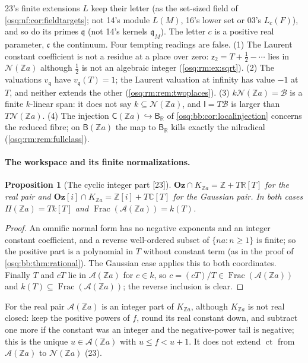 \documentclass[11pt,letterpaper]{article}
\numberwithin{equation}{section}
\newtheorem{proposition}[proposition]{Proposition}
\theoremstyle{definition}
\theoremstyle{remark}
\theoremstyle{plain}
\newcommand{\Oz}{\mathbf{Oz}}
\newcommand{\GOz}{\Oz[i]}
\newcommand{\Z}{\mathbb Z}
\newcommand{\R}{\mathbb R}
\newcommand{\C}{\mathbb C}
\newcommand{\A}{\mathcal A}          %
\newcommand{\NN}{\mathcal N}         %
\newcommand{\ct}{\operatorname{ct}}
\newcommand{\Frac}{\operatorname{Frac}}
\newcommand{\src}[1]{\textup{\textsf{[#1]}}}
\begin{document}
23's finite extensions $L$ keep their letter (as the set-sized field of \cref{osq:nf:cor:fieldtargets}; not 14's module $L(M)$, 16's lower set or
03's $L_c(F)$), and so do its primes $\mathfrak q$ (not 14's kernels $\mathfrak q_M$). The letter $c$ is a positive real parameter, $\mathfrak c$ the
continuum. Four tempting readings are false. (1) The Laurent constant coefficient is not a residue at a place over zero: $\mathsf z_2=T+\frac12-\cdots$
lies in $\NN(\Z a)$ although $\frac12$ is not an algebraic integer (\cref{osq:rm:ex:sqrt}). (2) The valuations $v_{\mathfrak q}$ have $v_{\mathfrak q}(T)=1$;
the Laurent valuation at infinity has value $-1$ at $T$, and neither extends the other (\cref{osq:rm:rem:twoplaces}). (3) $k\NN(\Z a)=\mathscr B$ is a finite
$k$-linear span: it does not say $k\subseteq\NN(\Z a)$, and $\mathsf I=T\mathscr B$ is larger than $T\NN(\Z a)$. (4) The injection
$\mathsf C(\Z a)\hookrightarrow\mathsf B_\R$ of \cref{osq:bb:cor:localinjection} concerns the reduced fibre; on $\mathsf B(\Z a)$ the map to $\mathsf B_\R$
kills exactly the nilradical (\cref{osq:rm:rem:fullclass}).

\paragraph{The workspace and its finite normalizations.}

\begin{proposition}[The cyclic integer part \src{23}]\label{osq:rm:prop:cyclic}
$\Oz\cap K_{\Z a}=\Z+T\R[T]$ for the real pair and $\GOz\cap K_{\Z a}=\Z[i]+T\C[T]$ for the Gaussian pair. In both cases $\Pi(\Z a)=Tk[T]$ and
$\Frac(\A(\Z a))=k(T)$.
\end{proposition}
\begin{proof}
An omnific normal form has no negative exponents and an integer constant coefficient, and a reverse well-ordered subset of $\{na:n\ge1\}$ is finite;
so the positive part is a polynomial in $T$ without constant term (as in the proof of \cref{osq:bb:thm:rational}). The Gaussian case applies this to
both coordinates. Finally $T$ and $cT$ lie in $\A(\Z a)$ for $c\in k$, so $c=(cT)/T\in\Frac(\A(\Z a))$ and $k(T)\subseteq\Frac(\A(\Z a))$; the reverse
inclusion is clear.
\end{proof}

For the real pair $\A(\Z a)$ is an integer part of $K_{\Z a}$, although $K_{\Z a}$ is not real closed: keep the positive powers of $f$, round its real
constant down, and subtract one more if the constant was an integer and the negative-power tail is negative; this is the unique $u\in\A(\Z a)$ with
$u\le f<u+1$. It does not extend $\ct$ from $\A(\Z a)$ to $\NN(\Z a)$ (23).
\end{document}
